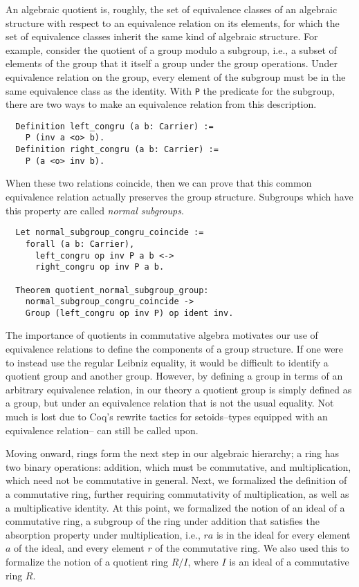\documentclass{article}
\begin{document}
An algebraic quotient is, roughly, the set of equivalence classes of an
algebraic structure with respect to an equivalence relation on its elements,
for which the set of equivalence classes inherit the same kind of algebraic
structure. For example, consider the quotient of a group modulo a subgroup,
i.e., a subset of elements of the group that it itself a group under the group
operations. Under equivalence relation on the group, every element of the
subgroup must be in the same equivalence class as the identity. With \texttt{P}
the predicate for the subgroup, there are two ways to make an equivalence
relation from this description.

\begin{verbatim}
  Definition left_congru (a b: Carrier) :=
    P (inv a <o> b).
  Definition right_congru (a b: Carrier) :=
    P (a <o> inv b).
\end{verbatim}

When these two relations coincide, then we can prove that this common
equivalence relation actually preserves the group structure. Subgroups which
have this property are called \emph{normal subgroups}.

\begin{verbatim}
  Let normal_subgroup_congru_coincide :=
    forall (a b: Carrier),
      left_congru op inv P a b <->
      right_congru op inv P a b.

  Theorem quotient_normal_subgroup_group:
    normal_subgroup_congru_coincide ->
    Group (left_congru op inv P) op ident inv.
\end{verbatim}

The importance of quotients in commutative algebra motivates our use of
equivalence relations to define the components of a group structure. If one
were to instead use the regular Leibniz equality, it would be difficult to
identify a quotient group and another group. However, by  defining a group in
terms of an arbitrary equivalence relation, in our theory a quotient group is 
simply defined as a group, but under an equivalence relation that is not the usual 
equality. 
Not much is lost due to Coq's rewrite tactics for setoids--types equipped with an equivalence relation--
can still be called upon.

Moving onward, rings form the next step in our algebraic hierarchy; a ring has two binary
operations: addition, which must be commutative, and multiplication, which need
not be commutative in general. Next, we formalized the definition of a commutative
ring, further requiring commutativity of multiplication, as well as a
multiplicative identity. At this point, we formalized the notion of an ideal of
a commutative ring, a subgroup of the ring under addition that satisfies the
absorption property under multiplication, i.e., \(r a\) is in the ideal for
every element \(a\) of the ideal, and every element \(r\) of the commutative
ring. We also used this to formalize the notion of a quotient ring $R/I$, where
$I$ is an ideal of a commutative ring $R$.
\end{document}
